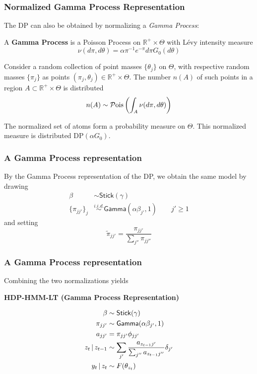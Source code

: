 \documentclass[11pt, mathserif, handout, table]{beamer}
\begin{document}
\begin{frame}
  \frametitle{Normalized Gamma Process Representation}
  The DP can also be obtained by normalizing a {\it Gamma Process}:

\begin{exampleblock}{\small
  A {\bf Gamma Process} is a Poisson Process on $\mathbb{R}^{+} \times
  \Theta$ with L\'evy intensity measure
  \begin{equation}
    \label{eq:8}
    \nu(d\pi, d\theta) = \alpha \pi^{-1} e^{-\pi} d\pi G_0(d\theta)
  \end{equation}

  Consider a random collection of point masses $\{\theta_j\}$
  on $\Theta$, with respective random masses $\{\pi_j\}$ as points
  $(\pi_j,\theta_j) \in \mathbb{R}^+ \times \Theta$.  The number $n(A)$
  of such points in a region $A \subset \mathbb{R}^+ \times \Theta$ is
  distributed
  \begin{equation}
    \label{eq:9}
    n(A) \sim \mathcal{P}\mathrm{ois}\left(\int_A \nu(d\pi, d\theta)\right)
  \end{equation}
}
\end{exampleblock}

  The normalized set of atoms form a probability measure on $\Theta$.
  This normalized measure is distributed $\mathrm{DP}(\alpha G_0)$.
\end{frame}
\begin{frame}
  \frametitle{A Gamma Process representation}
  By the Gamma Process representation of the DP, we obtain the same
  model by drawing 
  \begin{align*}
    \beta &\sim \mathsf{Stick(\gamma)} \\
    \{\pi_{jj'}\}_{j} &\stackrel{i.i.d.}{\sim} \mathsf{Gamma}(\alpha
      \beta_{j'},1) \qquad j' \geq 1
  \end{align*}
  and setting
\begin{equation*}
    \label{eq:14}
    \tilde{\pi}_{jj'} = \frac{\pi_{jj'}}{\sum_{j''} \pi_{jj''}}
  \end{equation*}
\end{frame}
\begin{frame}
  \frametitle{A Gamma Process representation}
  Combining the two normalizations yields
  \begin{exampleblock}{\small
      {\bf HDP-HMM-LT (Gamma Process Representation)}

    \begin{align*}
      \beta &\sim \mathsf{Stick}(\gamma) \\
      \pi_{jj'} &\sim \mathsf{Gamma}(\alpha\beta_{j'},1) \\
      a_{jj'} &= \pi_{jj'}\phi_{jj'} \\
      z_t \, \vert \, z_{t-1} &\sim \sum_{j'} \frac{a_{z_{t-1}j'}}{\sum_{j''}
        a_{z_{t-1}j''}} \delta_{j'} \\
      y_t \, \vert \, z_t &\sim F(\theta_{z_t})
    \end{align*}
}
  \end{exampleblock}
\end{frame}
\end{document}
